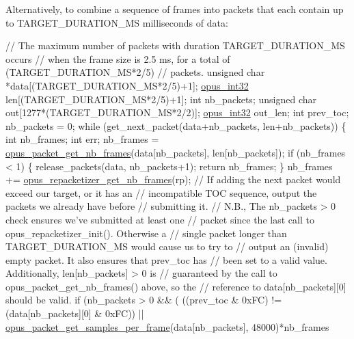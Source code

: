 Alternatively, to combine a sequence of frames into packets that each contain up to {\ttfamily T\+A\+R\+G\+E\+T\+\_\+\+D\+U\+R\+A\+T\+I\+O\+N\+\_\+\+MS} milliseconds of data\+: 
\begin{DoxyCode}
\textcolor{comment}{// The maximum number of packets with duration TARGET\_DURATION\_MS occurs}
\textcolor{comment}{// when the frame size is 2.5 ms, for a total of (TARGET\_DURATION\_MS*2/5)}
\textcolor{comment}{// packets.}
\textcolor{keywordtype}{unsigned} \textcolor{keywordtype}{char} *data[(TARGET\_DURATION\_MS*2/5)+1];
\hyperlink{opus__types_8h_aa4d309d6f80b99dbabebc8f98879ab9a}{opus\_int32} len[(TARGET\_DURATION\_MS*2/5)+1];
\textcolor{keywordtype}{int} nb\_packets;
\textcolor{keywordtype}{unsigned} \textcolor{keywordtype}{char} out[1277*(TARGET\_DURATION\_MS*2/2)];
\hyperlink{opus__types_8h_aa4d309d6f80b99dbabebc8f98879ab9a}{opus\_int32} out\_len;
\textcolor{keywordtype}{int} prev\_toc;
nb\_packets = 0;
\textcolor{keywordflow}{while} (get\_next\_packet(data+nb\_packets, len+nb\_packets))
\{
  \textcolor{keywordtype}{int} nb\_frames;
  \textcolor{keywordtype}{int} err;
  nb\_frames = \hyperlink{group__opus__decoder_ga932edb5fbae85cf452650ef390f52849}{opus\_packet\_get\_nb\_frames}(data[nb\_packets], len[nb\_packets]);
  \textcolor{keywordflow}{if} (nb\_frames < 1)
  \{
    release\_packets(data, nb\_packets+1);
    \textcolor{keywordflow}{return} nb\_frames;
  \}
  nb\_frames += \hyperlink{group__opus__repacketizer_ga0abed93ad18e8b2bd8b5bd10189c3e97}{opus\_repacketizer\_get\_nb\_frames}(rp);
  \textcolor{comment}{// If adding the next packet would exceed our target, or it has an}
  \textcolor{comment}{// incompatible TOC sequence, output the packets we already have before}
  \textcolor{comment}{// submitting it.}
  \textcolor{comment}{// N.B., The nb\_packets > 0 check ensures we've submitted at least one}
  \textcolor{comment}{// packet since the last call to opus\_repacketizer\_init(). Otherwise a}
  \textcolor{comment}{// single packet longer than TARGET\_DURATION\_MS would cause us to try to}
  \textcolor{comment}{// output an (invalid) empty packet. It also ensures that prev\_toc has}
  \textcolor{comment}{// been set to a valid value. Additionally, len[nb\_packets] > 0 is}
  \textcolor{comment}{// guaranteed by the call to opus\_packet\_get\_nb\_frames() above, so the}
  \textcolor{comment}{// reference to data[nb\_packets][0] should be valid.}
  \textcolor{keywordflow}{if} (nb\_packets > 0 && (
      ((prev\_toc & 0xFC) != (data[nb\_packets][0] & 0xFC)) ||
      \hyperlink{group__opus__decoder_ga885564fa670e308100dfda89d3cdea10}{opus\_packet\_get\_samples\_per\_frame}(data[nb\_packets], 48000)*nb\_frames

\end{DoxyCode}
